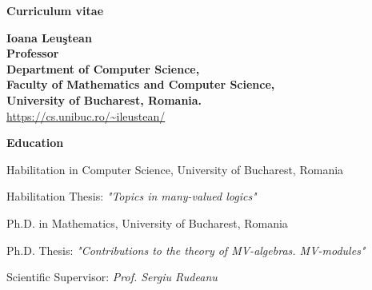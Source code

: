 \documentclass[11pt]{article}
\begin{document}
\begin{center}
{\Large{\bf  Curriculum vitae}}
\end{center}

\vspace{.2cm}


 
\hspace{0.5cm}


\noindent\textbf{Ioana Leu\c{s}tean}\\
\noindent\textbf{Professor}\\
 \noindent\textbf{Department of Computer Science,\\
\noindent Faculty of Mathematics and Computer Science,\\ 
\noindent University of Bucharest, Romania.}\\
\noindent\url{https://cs.unibuc.ro/~ileustean/}\\


\vspace{.3cm}



\noindent
\textbf{Education}

\noindent
[2017] Habilitation in Computer Science, University of Bucharest, Romania

Habilitation Thesis: {\em "Topics in many-valued logics"}

\noindent
[2004] Ph.D. in Mathematics, University of Bucharest, Romania

Ph.D. Thesis: {\em "Contributions to the theory of MV-algebras. MV-modules"}

Scientific Supervisor: {\em Prof. Sergiu Rudeanu}
\end{document}
